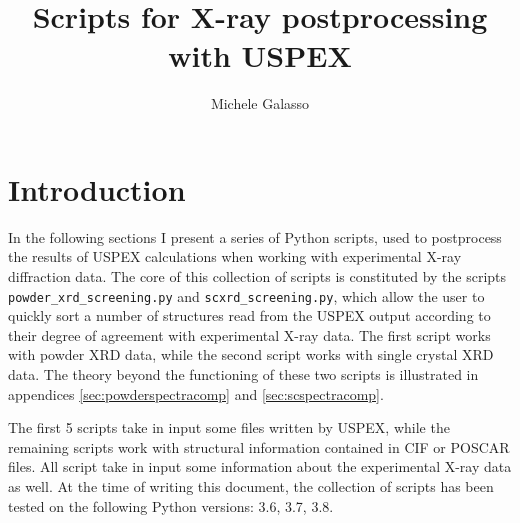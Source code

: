 \documentclass{article}
\begin{document}
\title{Scripts for X-ray postprocessing with USPEX}
\author{Michele Galasso}

\maketitle


\section{Introduction}
In the following sections I present a series of Python scripts, used to postprocess the results of USPEX calculations when working with experimental X-ray diffraction data. The core of this collection of scripts is constituted by the scripts \texttt{powder\_xrd\_screening.py} and \texttt{scxrd\_screening.py}, which allow the user to quickly sort a number of structures read from the USPEX output according to their degree of agreement with experimental X-ray data. The first script works with powder XRD data, while the second script works with single crystal XRD data. The theory beyond the functioning of these two scripts is illustrated in appendices \ref{sec:powderspectracomp} and \ref{sec:scspectracomp}.

The first 5 scripts take in input some files written by USPEX, while the remaining scripts work with structural information contained in CIF or POSCAR files. All script take in input some information about the experimental X-ray data as well. At the time of writing this document, the collection of scripts has been tested on the following Python versions: 3.6, 3.7, 3.8.
\end{document}
